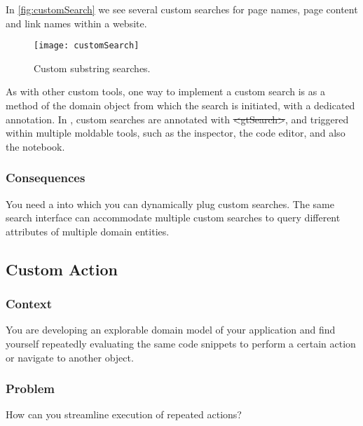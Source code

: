 \documentclass[sigconf]{acmart}
\renewcommand{\nbc}[3]{} %
\newcommand\on[1]{\nbc{ON}{#1}{olive}} %
\newcommand\eog[1]{\nbc{Edward}{#1}{purple}}
\newcommand{\pattern}[1]{\emph{\nameref{pat:#1}}\xspace}
\newcommand{\GT}{\lst{GT}\xspace} %
\begin{document}
In \autoref{fig:customSearch} we see several custom searches for page names, page content and link names within a website.

\begin{figure}[h]
  \texttt{[image: customSearch]}
  \caption{Custom substring searches.}
  \label{fig:customSearch}
\end{figure}

\eog{I think what I was curious about is if there is a way to use an example of a domain specific custom search example, that would be really cool.
So I don't know, maybe something in ludo or like something more than just like researching.}

As with other custom tools, one way to implement a custom search is as a method of the domain object from which the search is initiated, with a dedicated annotation.
In \GT, custom searches are annotated with \st{<gtSearch>}, and triggered within multiple moldable tools, such as the inspector, the code editor, and also the notebook.

\subsubsection*{Consequences}
You need a \pattern{moldableTool} into which you can dynamically plug custom searches.
The same search interface can accommodate multiple custom searches to query different attributes of multiple domain entities.

\subsection*{Custom Action}\label{pat:customAction}
\subsubsection*{Context}
You are developing an explorable domain model of your application and find yourself repeatedly evaluating the same code snippets to perform a certain action or navigate to another object.

\subsubsection*{Problem}
How can you streamline execution of repeated actions?
\end{document}
